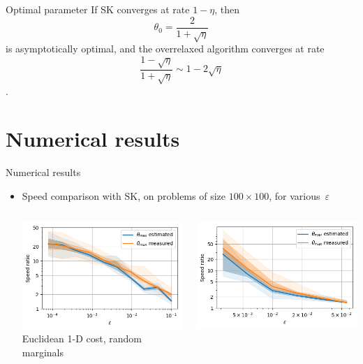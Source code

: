 \documentclass[compress]{beamer}
\renewcommand{\epsilon}{\varepsilon}
\begin{document}
\begin{frame}{Optimal parameter}
		If SK converges at rate $1-\eta$, then $$\theta_0 = \frac{2}{1+\sqrt{\eta}}$$ is asymptotically optimal, and the overrelaxed algorithm converges at rate $$\frac{1-\sqrt{\eta}}{1+\sqrt{\eta}} \sim 1-2\sqrt{\eta}$$.
\end{frame}

\section{Numerical results}
\begin{frame}{Numerical results}
	\begin{itemize}
	\item Speed comparison with SK, on problems of size $100 \times 100$, for various~$\epsilon$\\
	\begin{columns}
		\begin{column}{0.5\textwidth}
			\centering
			\includegraphics[width=\textwidth]{images/speedratio_image}\\
			\footnotesize Euclidean 1-D cost, random marginals
		\end{column}
		\begin{column}{0.5\textwidth}
			\centering
			\includegraphics[width=\textwidth]{images/speedratio_ML}\\

\end{column}
\end{columns}
\end{itemize}
\end{frame}
\end{document}
